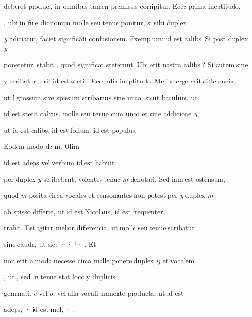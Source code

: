 deberet produci, in omnibus tamen premissis corripitur. Ecce prima ineptitudo. 

, ubi in fine diccionum  molle seu tenue ponitur, si sibi duplex

\textit{y} adiciatur, faciet significati confusionem. Exemplum:  id est calibs. Si post  duplex \textit{y}

poneretur, stabit , quod significat steterunt. Ubi erit nostra calibs ? Si autem sine

y scribatur, erit  id est stetit.  Ecce alia ineptitudo. Melior ergo erit differencia,

ut ḷ grossum sive spissum scribamus sine unco, sicut baculum, ut 

 id est stetit calvus,  molle seu tenue cum unco et sine addicione \textit{y},

\splitlines
ut  id est calibs,  id est folium,  id est populus.

\indentK Eodem modo de \textmd{m}. Olim

\fulllines
{}    id est adeps vel verbum id est habuit

per duplex \textit{y} scribebant, volentes tenue \textit{m} denotari. Sed iam est ostensum,

quod \textit{m} posita circa vocales et consonantes non potest per \textit{y} duplex \textit{m} 

 ab  spisso differre, ut  id est Nicolaus,  id est frequenter

trahit. Est igitur melior differencia, ut  molle seu tenue scribatur

sine cauda, ut sic: · · ¹·  . Et


\fullpreviouslines


{
\color{blue}


non erit a modo necesse circa  molle ponere duplex \textit{ij} et vocalem 

, ut  , sed \textit{ṃ} tenue stat loco y duplicis

geminati, \textit{e} vel \textit{o}, vel alia vocali manente producta, ut  id est

adeps, ·  id est mel, · .

}

